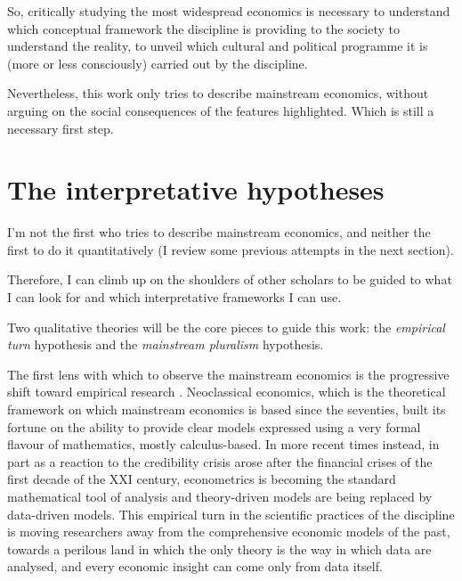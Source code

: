 \documentclass[a4paper, 11pt, headings=standardclasses, tablecaptionsbelow]{scrartcl}
\begin{document}
So, critically studying the most widespread economics is necessary to understand which conceptual framework the discipline is providing to the society to understand the reality, to unveil which cultural and political programme it is (more or less consciously) carried out by the discipline.

Nevertheless, this work only tries to describe mainstream economics, without arguing on the social consequences of the features highlighted. Which is still a necessary first step.

\section{The interpretative hypotheses}
I'm not the first who tries to describe mainstream economics, and neither the first to do it quantitatively (I review some previous attempts in the next section).

Therefore, I can climb up on the shoulders of other scholars to be guided to what I can look for and which interpretative frameworks I can use.

Two qualitative theories will be the core pieces to guide this work: the \textit{empirical turn} hypothesis and the \textit{mainstream pluralism} hypothesis.

The first lens with which to observe the mainstream economics is the progressive shift toward empirical research \parencite{backhouse2000,backhouse2016,backhouse2017,cherrier2022}.
Neoclassical economics, which is the theoretical framework on which mainstream economics is based since the seventies, built its fortune on the ability to provide clear models expressed using a very formal flavour of mathematics, mostly calculus-based.
In more recent times instead, in part as a reaction to the credibility crisis arose after the financial crises of the first decade of the XXI century, econometrics is becoming the standard mathematical tool of analysis and theory-driven models are being replaced by data-driven models.
This empirical turn in the scientific practices of the discipline is moving researchers away from the comprehensive economic models of the past, towards a perilous land in which the only theory is the way in which data are analysed, and every economic insight can come only from data itself.
\end{document}
